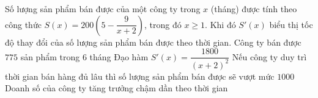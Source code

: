 \begin{ex}%
	Số lượng sản phẩm bán được của một công ty trong $x$ (tháng) được tính theo công thức $S(x) = 200 \left(5 - \dfrac{9}{x + 2}\right)$, trong đó $x \geq 1$. Khi đó $S'(x)$ biểu thị tốc độ thay đổi của số lượng sản phẩm bán được theo thời gian.
	\choiceTF
	{\True Công ty bán được $775$ sản phẩm trong $6$ tháng}
	{\True Đạo hàm $S'(x) = \dfrac{1800}{(x + 2)^2}$}
	{Nếu công ty duy trì thời gian bán hàng đủ lâu thì số lượng sản phẩm bán được sẽ vượt mức $1000$}
	{\True Doanh số của công ty tăng trưởng chậm dần theo thời gian}
\end{ex}
